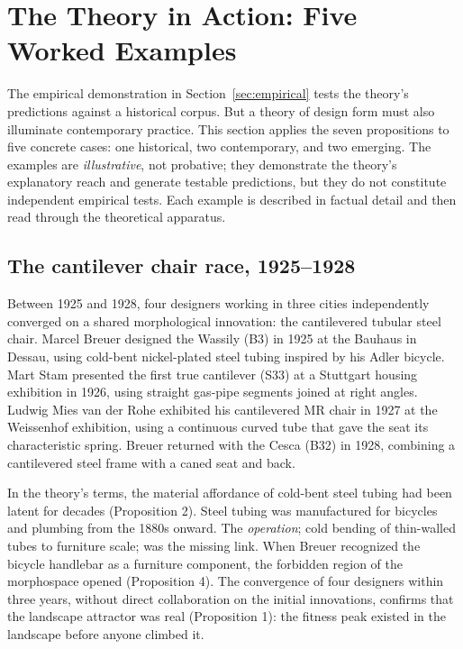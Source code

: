 \section{The Theory in Action: Five Worked Examples}
\label{sec:examples}

The empirical demonstration in Section~\ref{sec:empirical} tests the theory's predictions against a historical corpus. But a theory of design form must also illuminate contemporary practice. This section applies the seven propositions to five concrete cases: one historical, two contemporary, and two emerging. The examples are \textit{illustrative}, not probative; they demonstrate the theory's explanatory reach and generate testable predictions, but they do not constitute independent empirical tests. Each example is described in factual detail and then read through the theoretical apparatus.

\subsection{The cantilever chair race, 1925--1928}

Between 1925 and 1928, four designers working in three cities independently converged on a shared morphological innovation: the cantilevered tubular steel chair. Marcel Breuer designed the Wassily (B3) in 1925 at the Bauhaus in Dessau, using cold-bent nickel-plated steel tubing inspired by his Adler bicycle. Mart Stam presented the first true cantilever (S33) at a Stuttgart housing exhibition in 1926, using straight gas-pipe segments joined at right angles. Ludwig Mies van der Rohe exhibited his cantilevered MR chair in 1927 at the Weissenhof exhibition, using a continuous curved tube that gave the seat its characteristic spring. Breuer returned with the Cesca (B32) in 1928, combining a cantilevered steel frame with a caned seat and back.

In the theory's terms, the material affordance of cold-bent steel tubing had been latent for decades (Proposition 2). Steel tubing was manufactured for bicycles and plumbing from the 1880s onward. The \textit{operation}; cold bending of thin-walled tubes to furniture scale; was the missing link. When Breuer recognized the bicycle handlebar as a furniture component, the forbidden region of the morphospace opened (Proposition 4). The convergence of four designers within three years, without direct collaboration on the initial innovations, confirms that the landscape attractor was real (Proposition 1): the fitness peak existed in the landscape before anyone climbed it.


